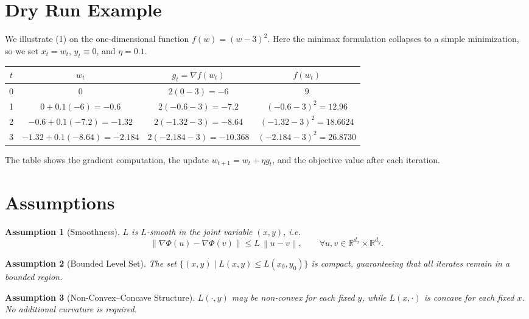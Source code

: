 \documentclass{article}
\newtheorem{assumption}{Assumption}
\newcommand{\norm}[1]{\left\lVert#1\right\rVert}
\begin{document}
\section*{Dry Run Example}
We illustrate (1) on the one‑dimensional function $f(w)=(w-3)^2$.
Here the minimax formulation collapses to a simple minimization, so we set $x_t=w_t$, $y_t\equiv 0$, and $\eta=0.1$.

\begin{center}
\begin{tabular}{c|c|c|c}
$t$ & $w_t$ & $g_t=\nabla f(w_t)$ & $f(w_t)$\\ \hline
0 & $0$ & $2(0-3)=-6$ & $9$\\
1 & $0+0.1(-6)=-0.6$ & $2(-0.6-3)=-7.2$ & $( -0.6-3)^2=12.96$\\
2 & $-0.6+0.1(-7.2)=-1.32$ & $2(-1.32-3)=-8.64$ & $( -1.32-3)^2=18.6624$\\
3 & $-1.32+0.1(-8.64)=-2.184$ & $2(-2.184-3)=-10.368$ & $( -2.184-3)^2=26.8730$\\
\end{tabular}
\end{center}
The table shows the gradient computation, the update $w_{t+1}=w_t+\eta g_t$, and the objective value after each iteration.

\newpage
\section*{Assumptions}
\begin{assumption}[Smoothness]
\label{as:smooth}
$L$ is $L$‑smooth in the joint variable $(x,y)$, i.e.
\[
\norm{\nabla\Phi(u)-\nabla\Phi(v)}\le L\,\norm{u-v},
\qquad\forall u,v\in\mathbb{R}^{d_x}\times\mathbb{R}^{d_y}.
\tag{2}
\]
\end{assumption}
\begin{assumption}[Bounded Level Set]
\label{as:bounded}
The set $\{(x,y)\mid L(x,y)\le L(x_0,y_0)\}$ is compact, guaranteeing that all iterates remain in a bounded region.
\end{assumption}
\begin{assumption}[Non‑Convex–Concave Structure]
\label{as:nc}
$L(\cdot,y)$ may be non‑convex for each fixed $y$, while $L(x,\cdot)$ is concave for each fixed $x$.
No additional curvature is required.
\end{assumption}
\end{document}

